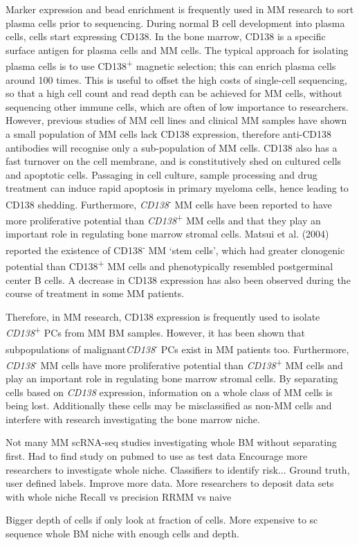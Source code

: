 Marker expression and bead enrichment is frequently used in MM research to sort plasma cells prior to sequencing.
During normal B cell development into plasma cells, cells start expressing CD138.
In the bone marrow, CD138 is a specific surface antigen for plasma cells and MM cells\cite{kawano2012multiple}.
The typical approach for isolating plasma cells is to use CD138\textsuperscript{+} magnetic selection;
this can enrich plasma cells around 100 times\cite{bansal2021impact}.
This is useful to offset the high costs of single-cell sequencing, so that a high cell count and read depth can be achieved for MM cells, without sequencing other immune cells, which are often of low importance to researchers.
However, previous studies of MM cell lines and clinical MM samples have shown a small population of MM cells lack CD138 expression\cite{matsui2004characterization}, therefore anti-CD138 antibodies will recognise only a sub-population of MM cells.
CD138 also has a fast turnover on the cell membrane, and is constitutively shed on cultured cells and apoptotic cells\cite{bansal2021impact}.
Passaging in cell culture, sample processing and drug treatment can induce rapid apoptosis in primary myeloma cells, hence leading to CD138 shedding.
Furthermore, \textit{CD138}\textsuperscript{-} MM cells have been reported to have more proliferative potential than \textit{CD138}\textsuperscript{+} MM cells and that they play an important role in regulating bone marrow stromal cells\cite{reid2010characterisation, wu2015cd138}.
Matsui et al. (2004) reported the existence of CD138\textsuperscript{-} MM `stem cells', which had greater clonogenic potential than CD138\textsuperscript{+} MM cells and phenotypically resembled postgerminal center B cells\cite{matsui2004characterization}.
A decrease in CD138 expression has also been observed during the course of treatment in some MM patients\cite{kawano2012multiple}.

Therefore, in MM research, CD138 expression is frequently used to isolate \textit{CD138}\textsuperscript{+} PCs from MM BM samples.
However, it has been shown that subpopulations of malignant\textit{CD138}\textsuperscript{-} PCs exist in MM patients too.
Furthermore, \textit{CD138}\textsuperscript{-} MM cells have more proliferative potential than \textit{CD138}\textsuperscript{+} MM cells and play an important role in regulating bone marrow stromal cells\cite{reid2010characterisation, wu2015cd138}.
By separating cells based on \textit{CD138} expression, information on a whole class of MM cells is being lost.
Additionally these cells may be misclassified as non-MM cells and interfere with research investigating the bone marrow niche.

Not many MM scRNA-seq studies investigating whole BM without separating first. Had to find study on pubmed to use as test data
Encourage more researchers to investigate whole niche.
Classifiers to identify risk...
Ground truth, user defined labels.
Improve more data. More researchers to deposit data sets with whole niche
Recall vs precision
RRMM vs naive

Bigger depth of cells if only look at fraction of cells. More expensive to sc sequence whole BM niche with enough cells and depth. 




